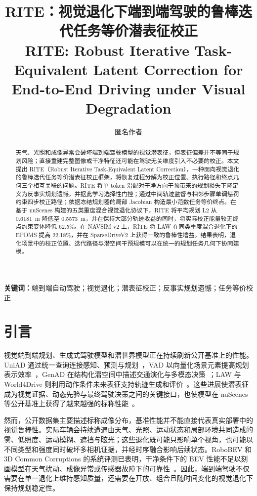 \documentclass[letterpaper,10pt,conference]{ieeeconf}
\title{\LARGE \bf
RITE：视觉退化下端到端驾驶的鲁棒迭代任务等价潜表征校正\\
\large RITE: Robust Iterative Task-Equivalent Latent Correction for End-to-End Driving under Visual Degradation
}
\author{匿名作者}
\begin{document}
\maketitle
\thispagestyle{empty}
\pagestyle{empty}

\begin{abstract}
天气、光照和成像异常会破坏端到端驾驶模型的视觉潜表征，但表征偏差并不等同于规划风险；直接重建完整图像或干净特征还可能在驾驶无关维度引入不必要的校正。本文提出 RITE（Robust Iterative Task-Equivalent Latent Correction），一种面向视觉退化的鲁棒迭代任务等价潜表征校正框架，将恢复过程分解为校正位置、执行路径和终点几何三个相互关联的问题。RITE 将单 token 沿配对干净方向干预带来的规划损失下降定义为反事实规划遗憾，并据此学习选择性门控；通过中间轨迹监督与相邻步骤单调惩罚约束四步校正路径；依据冻结规划器的局部 Jacobian 构造最小范数任务等价终点。在基于 nuScenes 构建的五类重度混合视觉退化协议下，RITE 将平均规划 L2 从 0.6181~m 降低至 0.5573~m，并在保持大部分轨迹收益的同时，将实际校正能量较无终点约束变体降低 62.5\%。在 NAVSIM v2 上，RITE 将 LAW 在同类重度混合退化下的 EPDMS 提高 22.18\%，并在 SparseDriveV2 上获得一致的鲁棒性增益。结果表明，退化场景中的校正位置、迭代路径与潜空间干预规模可以在统一的规划任务几何下协同建模。
\end{abstract}

\noindent\textbf{关键词：}端到端自动驾驶；视觉退化；潜表征校正；反事实规划遗憾；任务等价校正

\section{引言}

视觉端到端规划、生成式驾驶模型和潜世界模型正在持续刷新公开基准上的性能。UniAD 通过统一查询连接感知、预测与规划~\cite{hu2023uniad}，VAD 以向量化场景元素提高规划表示效率~\cite{jiang2023vad}，GenAD 在结构化潜空间中描述交通演化与多模态决策~\cite{zheng2024genad}；LAW 与 World4Drive 则利用动作条件未来表征支持轨迹生成和评价~\cite{li2025law,zheng2025world4drive}。这些进展使潜表征成为视觉证据、动态先验与最终驾驶决策之间的关键接口，也使模型在 nuScenes 等公开基准上获得了越来越强的标称性能~\cite{caesar2020nuscenes}。

然而，公开数据集主要描述标称成像分布，基准性能并不能直接代表真实部署中的视觉鲁棒性。实际车辆会持续遭遇由天气、光照、运动状态和局部环境共同造成的雾、低照度、运动模糊、遮挡与眩光；这些退化既可能只影响单个视角，也可能以不同类型和强度同时破坏多相机证据，并经时序融合影响后续状态。RoboBEV 和 3D Common Corruptions 的系统评测已表明，干净条件下的 BEV 性能不足以刻画模型在天气扰动、成像异常或传感器故障下的可靠性~\cite{xie2023robobev,dong2023commoncorruptions}。因此，端到端驾驶不仅需要在单一退化上维持感知质量，还需要在开放、组合且随时间变化的视觉退化下保持规划稳定性。
\end{document}
